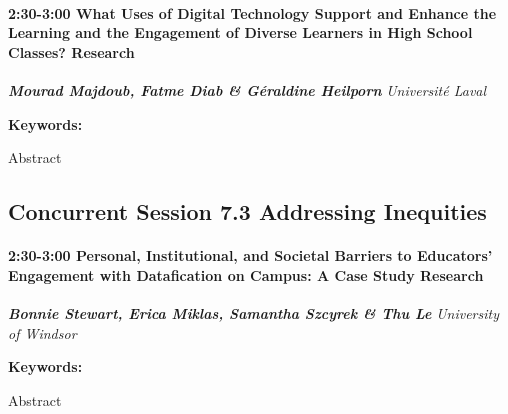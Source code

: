 \documentclass[
]{book}
\begin{document}
\begin{session}
\hypertarget{what-uses-of-digital-technology-support-and-enhance-the-learning-and-the-engagement-of-diverse-learners-in-high-school-classes-research}{%
\paragraph*{\texorpdfstring{2:30-3:00 \textbar{} \textbf{What Uses of
Digital Technology Support and Enhance the Learning and the Engagement
of Diverse Learners in High School Classes?} \textbar{}
Research}{2:30-3:00 \textbar{} What Uses of Digital Technology Support and Enhance the Learning and the Engagement of Diverse Learners in High School Classes? \textbar{} Research}}\label{what-uses-of-digital-technology-support-and-enhance-the-learning-and-the-engagement-of-diverse-learners-in-high-school-classes-research}}

\textbf{\emph{Mourad Majdoub, Fatme Diab \& Géraldine Heilporn}}
\textbar{} \emph{Université Laval}

\textbf{Keywords:}

Abstract
\end{session}

\hypertarget{concurrent-session-7.3-addressing-inequities}{%
\subsection*{Concurrent Session 7.3 \textbar{} Addressing Inequities}\label{concurrent-session-7.3-addressing-inequities}}

\begin{session}
\hypertarget{personal-institutional-and-societal-barriers-to-educators-engagement-with-datafication-on-campus-a-case-study-research}{%
\paragraph*{\texorpdfstring{2:30-3:00 \textbar{} \textbf{Personal,
Institutional, and Societal Barriers to Educators' Engagement with
Datafication on Campus: A Case Study} \textbar{}
Research}{2:30-3:00 \textbar{} Personal, Institutional, and Societal Barriers to Educators' Engagement with Datafication on Campus: A Case Study \textbar{} Research}}\label{personal-institutional-and-societal-barriers-to-educators-engagement-with-datafication-on-campus-a-case-study-research}}

\textbf{\emph{Bonnie Stewart, Erica Miklas, Samantha Szcyrek \& Thu Le}}
\textbar{} \emph{University of Windsor}

\textbf{Keywords:}

Abstract
\end{session}
\end{document}
